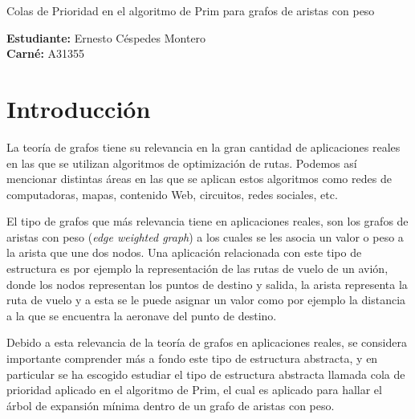 \documentclass[letterpaper]{article}
\begin{document}
\vspace*{2cm}

\begin{center}
\Huge
Colas de Prioridad en el algoritmo de Prim para grafos de aristas con peso
\vspace*{1cm}
\end{center}

\noindent
\small\baselineskip=14pt
\textbf{Estudiante:} Ernesto Céspedes Montero\\
\textbf{Carné:} A31355\\

\section{Introducción}

La teoría de grafos tiene su relevancia en la gran cantidad de aplicaciones reales en las que se utilizan algoritmos de optimización de rutas. Podemos así mencionar distintas áreas en las que se aplican estos algoritmos como redes de computadoras, mapas, contenido Web, circuitos, redes sociales, etc.

	El tipo de grafos que más relevancia tiene en aplicaciones reales, son los grafos de aristas con peso (\textit{edge weighted graph}) a los cuales se les asocia un valor o peso a la arista que une dos nodos. Una aplicación relacionada con este tipo de estructura es por ejemplo la representación de las rutas de vuelo de un avión, donde los nodos representan los puntos de destino y salida, la arista representa la ruta de vuelo y a esta se le puede asignar un valor como por ejemplo la distancia a la que se encuentra la aeronave del punto de destino.
	
	Debido a esta relevancia de la teoría de grafos en aplicaciones reales, se considera importante comprender más a fondo este tipo de estructura abstracta, y en particular se ha escogido estudiar el tipo de estructura abstracta llamada cola de prioridad aplicado en el algoritmo de Prim, el cual es aplicado para hallar el árbol de expansión mínima dentro de un grafo de aristas con peso.
\end{document}

